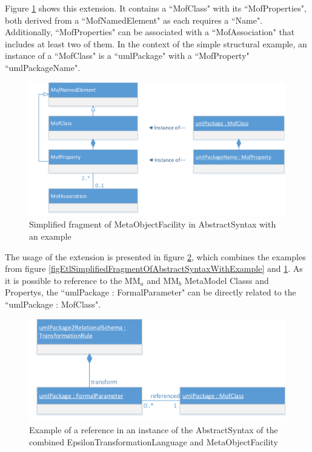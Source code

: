 Figure \ref{figMofSimplifiedFragmentOfAbstractSyntaxWithExample} shows this extension. It contains a ``MofClass" with its ``MofProperties", both derived from a ``MofNamedElement" as each requires a ``Name". Additionally, ``MofProperties" can be associated with a ``MofAssociation" that includes at least two of them. In the context of the simple structural example, an instance of a ``MofClass" is a ``umlPackage" with a ``MofProperty" ``umlPackageName".

\begin{figure}[htb]
	\centering
	\includegraphics[scale=0.6]{Images/MofSimplifiedFragmentOfAbstractSyntaxWithExample.pdf} 
	\caption{Simplified fragment of \Gls{MetaObjectFacility} in \gls{AbstractSyntax} with an example}
	\label{figMofSimplifiedFragmentOfAbstractSyntaxWithExample}
\end{figure}

The usage of the extension is presented in figure \ref{figEtlandMofAbstractSyntaxReferenceExample}, which combines the examples from figure \ref{figEtlSimplifiedFragmentOfAbstractSyntaxWithExample} and \ref{figMofSimplifiedFragmentOfAbstractSyntaxWithExample}. As it is possible to reference to the MM$_a$ and MM$_b$ \gls{MetaModel} \glspl{Class} and \glspl{Property}, the ``umlPackage : FormalParameter" can be directly related to the ``umlPackage : MofClass".

\begin{figure}[htb]
	\centering
	\includegraphics[scale=0.6]{Images/ETLandMofAbstractSyntaxReferenceExample.pdf} 
	\caption{Example of a reference in an instance of the \gls{AbstractSyntax} of the combined \Gls{EpsilonTransformationLanguage} and \Gls{MetaObjectFacility}}
	\label{figEtlandMofAbstractSyntaxReferenceExample}
\end{figure}

